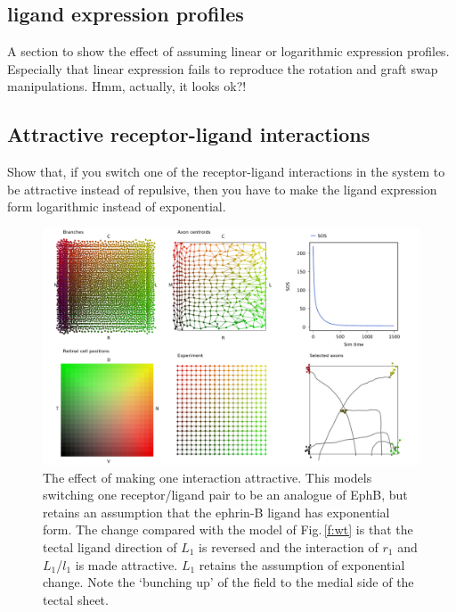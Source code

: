 \documentclass[11pt, a4paper]{article}
\begin{document}
\subsection*{ligand expression profiles}

A section to show the effect of assuming linear or logarithmic expression
profiles. Especially that linear expression fails to reproduce the rotation
and graft swap manipulations. Hmm, actually, it looks ok?!

\subsection*{Attractive receptor-ligand interactions}

Show that, if you switch one of the receptor-ligand  interactions in the
system to be attractive instead of repulsive, then you have to make the ligand
expression form logarithmic instead of exponential.

\begin{figure}
\includegraphics[width=\linewidth]{./images/j4_ee_ephb_wt.png}
\caption{The effect of making one interaction attractive. This models
switching one receptor/ligand pair to be an analogue of EphB, but retains an
assumption that the ephrin-B ligand has exponential form. The change compared
with the model of Fig.\,\ref{f:wt} is that the tectal ligand direction of
$L_1$ is reversed and the interaction of $r_1$ and $L_1$/$l_1$ is made
attractive. $L_1$ retains the assumption of exponential change. Note the
`bunching up' of the field to the medial side of the tectal sheet.}
\label{f:ee_oneattractive}
\end{figure}
\end{document}
